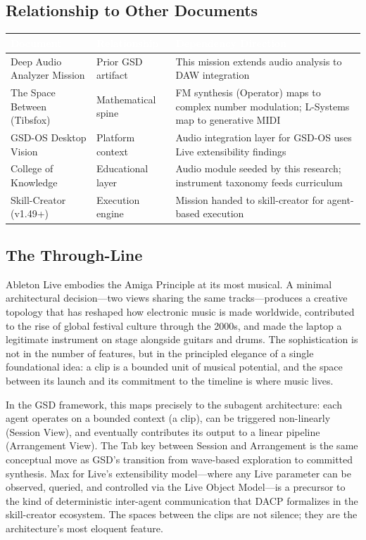\documentclass[11pt,letterpaper]{article}
\newcommand{\tableheader}[1]{\textbf{\sffamily\textcolor{white}{#1}}}
\begin{document}
\subsection{Relationship to Other Documents}

\begin{center}
\begin{tabularx}{\textwidth}{L{4cm}L{4cm}X}
\toprule
{}
\tableheader{Document} & \tableheader{Relationship} & \tableheader{Dependency Direction} \\
\midrule
Deep Audio Analyzer Mission & Prior GSD artifact & This mission extends audio analysis to DAW integration \\
The Space Between (Tibsfox) & Mathematical spine & FM synthesis (Operator) maps to complex number modulation; L-Systems map to generative MIDI \\
GSD-OS Desktop Vision & Platform context & Audio integration layer for GSD-OS uses Live extensibility findings \\
College of Knowledge & Educational layer & Audio module seeded by this research; instrument taxonomy feeds curriculum \\
Skill-Creator (v1.49+) & Execution engine & Mission handed to skill-creator for agent-based execution \\
\bottomrule
\end{tabularx}
\end{center}

\subsection{The Through-Line}

Ableton Live embodies the Amiga Principle at its most musical. A minimal architectural
decision---two views sharing the same tracks---produces a creative topology that has reshaped
how electronic music is made worldwide, contributed to the rise of global festival culture
through the 2000s, and made the laptop a legitimate instrument on stage alongside guitars
and drums. The sophistication is not in the number of features, but in the principled elegance
of a single foundational idea: a clip is a bounded unit of musical potential, and the space
between its launch and its commitment to the timeline is where music lives.

In the GSD framework, this maps precisely to the subagent architecture: each agent operates
on a bounded context (a clip), can be triggered non-linearly (Session View), and eventually
contributes its output to a linear pipeline (Arrangement View). The Tab key between Session
and Arrangement is the same conceptual move as GSD's transition from wave-based exploration
to committed synthesis. Max for Live's extensibility model---where any Live parameter can be
observed, queried, and controlled via the Live Object Model---is a precursor to the kind of
deterministic inter-agent communication that DACP formalizes in the skill-creator ecosystem.
The spaces between the clips are not silence; they are the architecture's most eloquent feature.
\end{document}

